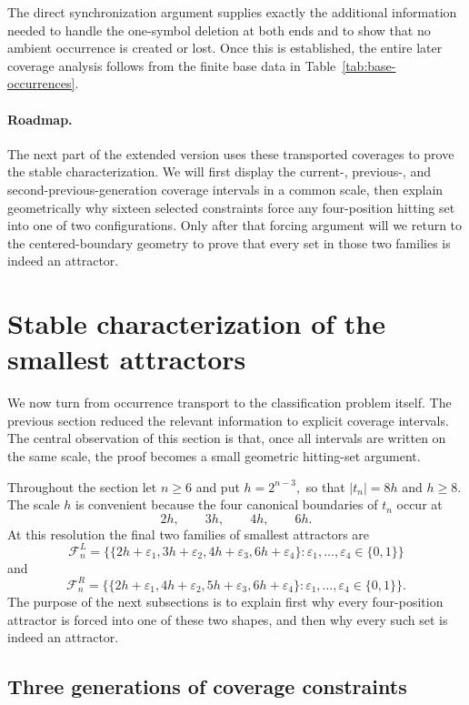 \documentclass[10pt,a4paper]{article}
\theoremstyle{definition}\newtheorem{definition}[theorem]{Definition}
\theoremstyle{remark}\newtheorem{remark}[theorem]{Remark}
\newcommand{\FL}{\mathcal{F}^{L}}
\newcommand{\FR}{\mathcal{F}^{R}}
\begin{document}
The direct synchronization argument supplies exactly the additional information needed to handle the one-symbol deletion at both ends and to show that no ambient occurrence is created or lost. Once this is established, the entire later coverage analysis follows from the finite base data in Table~\ref{tab:base-occurrences}.

\paragraph{Roadmap.}
The next part of the extended version uses these transported coverages to prove the stable characterization. We will first display the current-, previous-, and second-previous-generation coverage intervals in a common scale, then explain geometrically why sixteen selected constraints force any four-position hitting set into one of two configurations. Only after that forcing argument will we return to the centered-boundary geometry to prove that every set in those two families is indeed an attractor.



\section{Stable characterization of the smallest attractors}
\label{sec:stable-characterization}

We now turn from occurrence transport to the classification problem itself.  The previous section reduced the relevant information to explicit coverage intervals.  The central observation of this section is that, once all intervals are written on the same scale, the proof becomes a small geometric hitting-set argument.

Throughout the section let $n\ge6$ and put
$
 h=2^{n-3},
$
so that $|t_n|=8h$ and $h\ge8$.  The scale $h$ is convenient because the four canonical boundaries of $t_n$ occur at
\[
 2h,\qquad 3h,\qquad 4h,\qquad 6h.
\]
At this resolution the final two families of smallest attractors are
\[
\FL_n=
\bigl\{\{2h+\varepsilon_1,3h+\varepsilon_2,4h+\varepsilon_3,6h+\varepsilon_4\}:
\varepsilon_1,\ldots,\varepsilon_4\in\{0,1\}\bigr\}
\]
and
\[
\FR_n=
\bigl\{\{2h+\varepsilon_1,4h+\varepsilon_2,5h+\varepsilon_3,6h+\varepsilon_4\}:
\varepsilon_1,\ldots,\varepsilon_4\in\{0,1\}\bigr\}.
\]
The purpose of the next subsections is to explain first why every four-position attractor is forced into one of these two shapes, and then why every such set is indeed an attractor.

\subsection{Three generations of coverage constraints}
\label{subsec:ABC-coverages}
\end{document}
